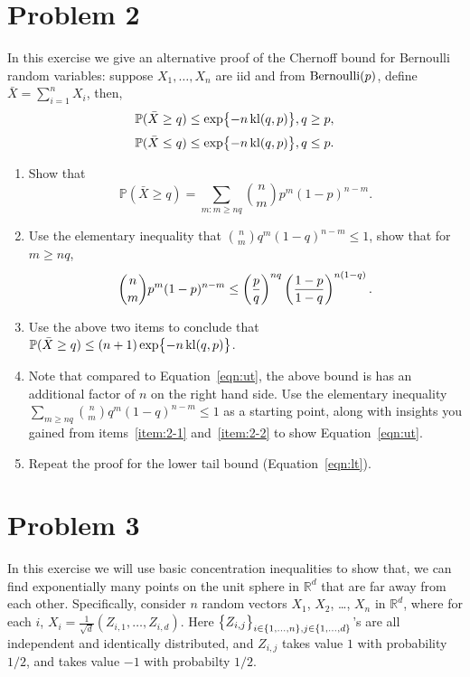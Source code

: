 \documentclass{article}
\DeclareMathOperator*{\kl}{{\rm kl}}
\DeclareMathOperator*{\Ber}{{\rm Bernoulli}}
\newcommand{\RR}{\mathbb{R}} %
\newcommand{\PP}{\mathbb{P}} %
\begin{document}
\section*{Problem 2}
In this exercise we give an alternative proof of the Chernoff bound for Bernoulli random
variables: suppose $X_1,\ldots,X_n$ are iid and from $\Ber(p)$, define
$\bar{X} = \sum_{i=1}^n X_i$, then,
\begin{equation}
  \PP( \bar{X} \geq q ) \leq \exp{-n \kl(q,p)}, q \geq p,
  \label{eqn:ut}
\end{equation}
\begin{equation}
  \PP( \bar{X} \leq q ) \leq \exp{-n \kl(q,p)}, q \leq p.
  \label{eqn:lt}
\end{equation}
\begin{enumerate}
\item Show that
\[ \PP( \bar{X} \geq q ) = \sum_{m: m \geq nq} {n \choose m} p^m (1-p)^{n-m}. \]
\label{item:2-1}
\item Use the elementary inequality that ${n \choose m} q^m (1-q)^{n-m} \leq 1$, show that for $m \geq nq$,
\[ {n \choose m} p^m (1-p)^{n-m} \leq \del{\frac{p}{q}}^{nq} \del{\frac{1-p}{1-q}}^{n(1-q)}. \]
\label{item:2-2}
\item Use the above two items to conclude that $\PP( \bar{X} \geq q ) \leq (n+1)\exp{-n \kl(q,p)}$.
\item Note that compared to Equation~\ref{eqn:ut}, the above bound is has an additional factor of $n$ on the right hand side.
Use the elementary inequality
 $\sum_{m \geq nq} {n \choose m} q^m (1-q)^{n-m} \leq 1$ as a starting point, along with insights you gained from
 items~\ref{item:2-1} and~\ref{item:2-2} to show Equation~\eqref{eqn:ut}.
\item Repeat the proof for the lower tail bound (Equation~\eqref{eqn:lt}).
\end{enumerate}

\section*{Problem 3}
In this exercise we will use basic concentration inequalities to show that,
we can find exponentially many points on the unit sphere in $\RR^d$ that are far away from each other.
Specifically, consider $n$ random vectors $X_1$, $X_2$, \ldots, $X_n$ in $\RR^d$,
where for each $i$, $X_i = \frac{1}{\sqrt{d}}(Z_{i,1}, \ldots, Z_{i,d})$. Here
$\cbr{Z_{i,j}}_{i \in \cbr{1,\ldots,n},j \in \cbr{1,\ldots,d}}$'s
are all independent and identically distributed, and $Z_{i,j}$ takes value $1$ with probability $1/2$, and takes value $-1$ with probabilty $1/2$.
\end{document}
